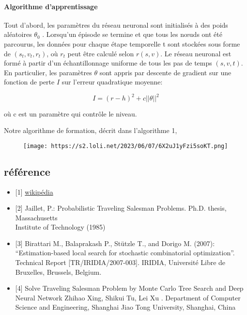 \documentclass[]{article}
\let\oldparagraph\paragraph
\renewcommand{\paragraph}[1]{\oldparagraph{#1}\mbox{}}
\begin{document}
\hypertarget{algorithme-dapprentissage}{%
\paragraph{Algorithme d'apprentissage}\label{algorithme-dapprentissage}}

Tout d'abord, les paramètres du réseau neuronal sont initialisés à des
poids aléatoires \(\theta_0\) . Lorsqu'un épisode se termine et que tous
les nœuds ont été parcourus, les données pour chaque étape temporelle t
sont stockées sous forme de \((s_t , v_t , r_t )\), où \(r_t\) peut être
calculé selon \(r(s,v)\). Le réseau neuronal est formé à partir d'un
échantillonnage uniforme de tous les pas de temps \((s, v, t)\). En
particulier, les paramètres \(\theta\) sont appris par descente de
gradient sur une fonction de perte \(I\) sur l'erreur quadratique
moyenne:

\[I = (r-h)^2 +c||\theta||^2\]

où c est un paramètre qui contrôle le niveau.

Notre algorithme de formation, décrit dans l'algorithme 1,

\begin{figure}
\centering
\texttt{[image: https://s2.loli.net/2023/06/07/6X2uJ1yFzi5soKT.png]}
\caption{}
\end{figure}

\hypertarget{ruxe9fuxe9rence}{%
\subsection{référence}\label{ruxe9fuxe9rence}}

\begin{itemize}
\item
  {[}1{]}
  \href{https://en.wikipedia.org/wiki/Monte_Carlo_tree_search}{wikipédia}
\item
  {[}2{]} Jaillet, P.: Probabilistic Traveling Salesman Problems. Ph.D.
  thesis, Massachusetts\\
  Institute of Technology (1985)
\item
  {[}3{]} Birattari M., Balaprakash P., Stützle T., and Dorigo M.
  (2007): ``Estimation-based local search for stochastic combinatorial
  optimization''. Technical Report {[}TR/IRIDIA/2007-003{]}. IRIDIA,
  Université Libre de Bruxelles, Brussels, Belgium.
\end{itemize}

\begin{itemize}
\item
  {[}4{]} Solve Traveling Salesman Problem by Monte Carlo Tree Search
  and Deep Neural Network Zhihao Xing, Shikui Tu, Lei Xu . Department of
  Computer Science and Engineering, Shanghai Jiao Tong University,
  Shanghai, China
\end{itemize}
\end{document}
